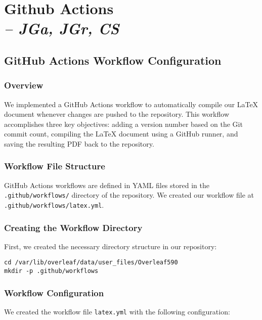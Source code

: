\chapter[Github Actions]{Github Actions \\
\small{\textit{-- JGa, JGr, CS}}
\label{Chapter::GithubActions}}

\section{GitHub Actions Workflow Configuration}

\subsection{Overview}

We implemented a GitHub Actions workflow to automatically compile our LaTeX document whenever changes are pushed to the repository. This workflow accomplishes three key objectives: adding a version number based on the Git commit count, compiling the LaTeX document using a GitHub runner, and saving the resulting PDF back to the repository.

\subsection{Workflow File Structure}

GitHub Actions workflows are defined in YAML files stored in the \texttt{.github/workflows/} directory of the repository. We created our workflow file at \texttt{.github/workflows/latex.yml}.

\subsection{Creating the Workflow Directory}

First, we created the necessary directory structure in our repository:

\begin{verbatim}
cd /var/lib/overleaf/data/user_files/Overleaf590
mkdir -p .github/workflows
\end{verbatim}

\subsection{Workflow Configuration}

We created the workflow file \texttt{latex.yml} with the following configuration:

